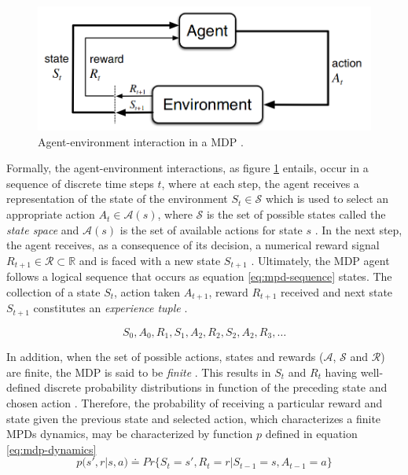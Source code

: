 \begin{figure}[H]
	\centering
	\includegraphics[width=0.75\linewidth]{./figures/mpd.png}
	\caption{Agent-environment interaction in a \acs{MDP}  \cite{suttonReinforcementLearningIntroduction2014}.}
	\label{fig:mpd-interaction}
\end{figure}

Formally, the agent-environment interactions, as figure \ref{fig:mpd-interaction} entails, occur in a sequence of discrete time steps $t$, where at each step, the agent receives a representation of the state of the environment $S_t \in \mathcal{S}$ which is used to select an appropriate action $A_t \in \mathcal{A}(s)$, where $\mathcal{S}$ is the set of possible states called the \textit{state space} and $\mathcal{A}(s)$ is the set of available actions for state $s$ \cite{suttonReinforcementLearningIntroduction2014, moralesGrokkingDeepReinforcement2020}. In the next step, the agent receives, as a consequence of its decision, a numerical reward signal $R_{t+1} \in \mathcal{R} \subset \mathbb{R}$ and is faced with a new state $S_{t +1}$ \cite{suttonReinforcementLearningIntroduction2014}. Ultimately, the \ac{MDP} agent follows a logical sequence that occurs as equation \ref{eq:mpd-sequence} states. The collection of a state $S_t$, action taken $A_{t+1}$, reward $R_{t+1}$ received and next state $S_{t+1}$ constitutes an \textit{experience tuple} \cite{moralesGrokkingDeepReinforcement2020}.

\begin{equation} \label{eq:mpd-sequence}
	S_0, A_0, R_1, S_1, A_2, R_2, S_2, A_2, R_3, \dots
\end{equation}

In addition, when the set of possible actions, states and rewards ($\mathcal{A}$, $\mathcal{S}$ and $\mathcal{R}$) are finite, the \ac{MDP} is said to be \textit{finite} \cite{suttonReinforcementLearningIntroduction2014}. This results in $S_t$ and $R_t$ having well-defined discrete probability distributions in function of the preceding state and chosen action \cite{suttonReinforcementLearningIntroduction2014}. Therefore, the probability of receiving a particular reward and state given the previous state and selected action, which characterizes a finite \acp{MPD} dynamics, may be characterized by function $p$ defined in equation \ref{eq:mdp-dynamics}
\begin{equation} \label{eq:mdp-dynamics}
	p(s',r|s,a) \doteq Pr\{S_t = s', R_t = r | S_{t-1} = s, A_{t-1} = a\}
\end{equation}

